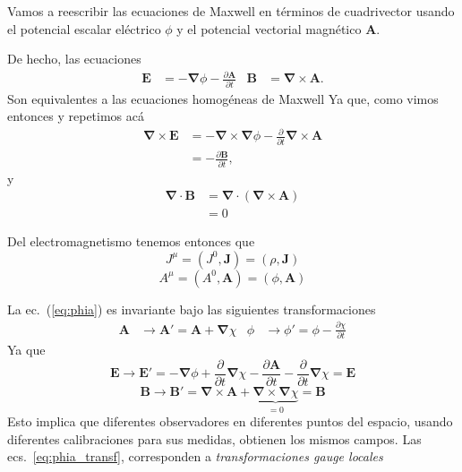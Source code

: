 Vamos a  reescribir las ecuaciones de Maxwell en términos de cuadrivector usando el potencial escalar eléctrico $\phi$ y el potencial vectorial magnético $\mathbf{A}$.

De hecho, las ecuaciones
\begin{align}
  \label{eq:phia}
  \mathbf{E}&=-\boldsymbol{\nabla}\phi-\frac{\partial\mathbf{A}}{\partial t}&
  \mathbf{B}&=\boldsymbol{\nabla}\times\mathbf{A}.
\end{align}
 Son equivalentes a las ecuaciones homogéneas de Maxwell Ya que, como vimos entonces y repetimos acá
\begin{align*}
  \boldsymbol{\nabla}\times\mathbf{E}&=-\boldsymbol{\nabla}\times\boldsymbol{\nabla}\phi-\frac{\partial}{\partial t}\boldsymbol{\nabla}\times\mathbf{A}\\
  &=-\frac{\partial\mathbf{B}}{\partial t},
\end{align*}
y
\begin{align*}
  \boldsymbol{\nabla}\cdot\mathbf{B}&=\boldsymbol{\nabla}\cdot(\boldsymbol{\nabla}\times\mathbf{A})\\
  &=0
\end{align*}


\begin{frame}
Del electromagnetismo tenemos entonces que
\begin{equation}
  \label{eq:cv_jmu}
  J^\mu=(J^0,\mathbf{J})=(\rho,\mathbf{J})
\end{equation}
\begin{equation}
  \label{eq:cv_phia}
  A^\mu=(A^0,\mathbf{A})=(\phi,\mathbf{A})
\end{equation}
\end{frame}

La ec.~(\ref{eq:phia}) es invariante bajo las siguientes transformaciones
\begin{align}
  \label{eq:phia_transf}
  \mathbf{A}&\to\mathbf{A}'=\mathbf{A}+\boldsymbol{\nabla}\chi&
  \phi&\to\phi'=\phi-\frac{\partial\chi}{\partial t} 
\end{align}
Ya que
\begin{equation}
  \label{eq:Etrans}
  \mathbf{E}\to\mathbf{E}'= -\boldsymbol{\nabla}\phi+\frac{\partial}{\partial t}\boldsymbol{\nabla}\chi
  -\frac{\partial\mathbf{A}}{\partial t}-\frac{\partial}{\partial t}\boldsymbol{\nabla}\chi=\mathbf{E}
\end{equation}
\begin{equation}
  \label{eq:btransf}
  \mathbf{B}\to\mathbf{B}'= \boldsymbol{\nabla}\times\mathbf{A}+
  \underbrace{\boldsymbol{\nabla}\times\boldsymbol{\nabla}\chi}_{\displaystyle =0}=\mathbf{B}
\end{equation}
Esto implica que diferentes observadores en diferentes puntos del espacio, usando diferentes calibraciones para sus medidas, obtienen los mismos campos. Las  ecs.~\eqref{eq:phia_transf}, corresponden a \emph{transformaciones gauge locales}

